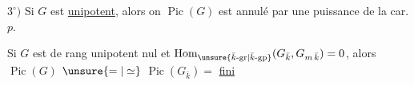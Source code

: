 
$3^\circ)$ Si $G$ est \uline{unipotent}, alors on  $\operatorname{Pic}(G)$
est annulé par une puissance de la car. $p$.

Si $G$ est de rang unipotent nul et $\operatorname{Hom}_{\unsure{\bar k\text{-}\mathrm{gr}|\bar k\text{-}\mathrm{gp}}}(G_{\bar k},G_{m\,\bar k})
=0$, alors $\operatorname{Pic}(G)$  $\unsure{=|\simeq}$  $\operatorname{Pic}(G_{\bar k})={}$ \uline{} \uline{fini}

